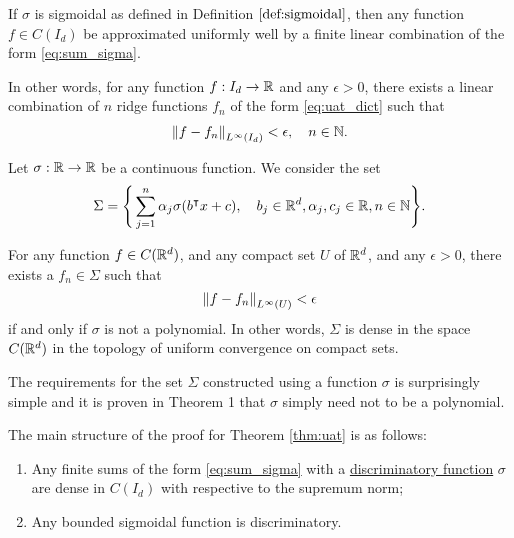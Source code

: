 \begin{theorem}
    \label{thm:uat}
    If $\sigma$ is sigmoidal as defined in Definition $\ref{def:sigmoidal}$,
    then any function $f \in C(I_d)$ be approximated uniformly well by a finite
    linear combination of the form \eqref{eq:sum_sigma}.

    In other words, for any function $f: I_d \to \mathbb{R}$ and any $\epsilon > 0$,
    there exists a linear combination of $n$ ridge functions $f_n$ of the form
    \eqref{eq:uat_dict} such that
    \begin{align}
        \left\| f - f_n \right\|_{L^{\infty}(I_d)} < \epsilon, \quad n \in \mathbb{N}.
    \end{align}
\end{theorem}

\begin{proposition}
    Let $\sigma: \mathbb{R} \to \mathbb{R}$ be a continuous function. We consider the set
    \begin{equation}
        \Sigma = \Bigg\{
            \sum_{j=1}^n \alpha_j \sigma(b{}^{\intercal} x + c), \quad
            b_j \in \mathbb{R}^d, \alpha_j, c_j \in \mathbb{R}, n\in\mathbb{N}
        \Bigg\}.
    \end{equation}

    For any function $f \in C(\mathbb{R}^d)$, and any compact set $U$ of $\mathbb{R}^d$, and any
    $\epsilon > 0$, there exists a $f_n \in \Sigma$ such that 
    \begin{equation}
        \left\| f - f_n \right\|_{L^{\infty}(U)} < \epsilon
    \end{equation}
    if and only if $\sigma$ is not a polynomial. In other words, $\Sigma$ is
    dense in the space $C(\mathbb{R}^d)$ in the topology of uniform convergence on
    compact sets.
\end{proposition}

\begin{remark}
    The requirements for the set $\Sigma$ constructed using a function $\sigma$
    is surprisingly simple and it is proven in Theorem 1
    \cite[p. 10]{leshnoMultilayerFeedforwardNetworks1993} that $\sigma$ simply need not
    to be a polynomial.
\end{remark}

The main structure of the proof for Theorem \ref{thm:uat} is as follows:
\begin{enumerate}
    \item Any finite sums of the form \eqref{eq:sum_sigma} with a
    \hyperref[def:dis_func]{discriminatory function} $\sigma$ are dense in
    $C(I_d)$ with respective to the supremum norm;
    \item Any bounded sigmoidal function is discriminatory.
\end{enumerate}

